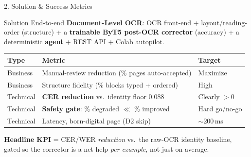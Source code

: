\documentclass[10pt,aspectratio=169]{beamer}
\begin{document}
\begin{frame}{2. Solution \& Success Metrics}
\begin{block}{Solution}
End-to-end \textbf{Document-Level OCR}: OCR front-end + layout/reading-order (structure) + a \textbf{trainable ByT5 post-OCR corrector} (accuracy) + a deterministic \textbf{agent} + REST API + Colab autopilot.
\end{block}

\begin{table}[h]
\centering\small
\begin{tabular}{lll}
\toprule
\textbf{Type} & \textbf{Metric} & \textbf{Target} \\
\midrule
Business  & Manual-review reduction (\% pages auto-accepted) & Maximize \\
Business  & Structure fidelity (\% blocks typed + ordered) & High \\
Technical & \textbf{CER reduction} vs.\ identity floor 0.088 & Clearly $>$0 \\
Technical & \textbf{Safety gate}: \% degraded $\ll$ \% improved & Hard go/no-go \\
Technical & Latency, born-digital page (D2 skip) & $\sim$200\,ms \\
\bottomrule
\end{tabular}
\end{table}

\textbf{Headline KPI} = CER/WER \emph{reduction} vs.\ the raw-OCR identity baseline, gated so the corrector is a net help \emph{per example}, not just on average.
\end{frame}
\end{document}
